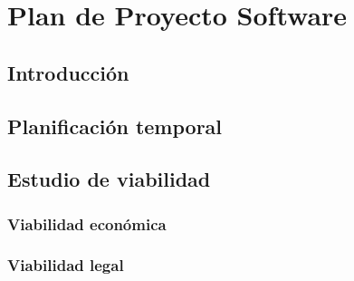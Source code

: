 \chapter{Plan de Proyecto Software} %
\label{cha:Plan de Proyecto Software}

\section{Introducción}

\section{Planificación temporal}

\section{Estudio de viabilidad}

\subsection{Viabilidad económica}

\subsection{Viabilidad legal}

